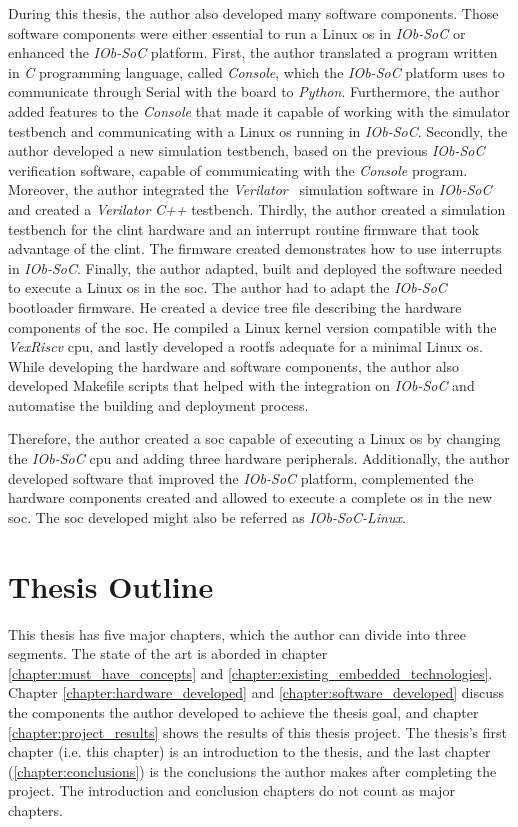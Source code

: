 During this thesis, the author also developed many software components. Those software components were either essential to run a Linux \acrshort{os} in \textit{IOb-SoC} or enhanced the \textit{IOb-SoC} platform. First, the author translated a program written in \textit{C} programming language, called \textit{Console}, which the \textit{IOb-SoC} platform uses to communicate through Serial with the board to \textit{Python}. Furthermore, the author added features to the \textit{Console} that made it capable of working with the simulator testbench and communicating with a Linux \acrshort{os} running in \textit{IOb-SoC}. Secondly, the author developed a new simulation testbench, based on the previous \textit{IOb-SoC} verification software, capable of communicating with the \textit{Console} program. Moreover, the author integrated the \textit{Verilator}~\cite{snyder2010verilator} simulation software in \textit{IOb-SoC} and created a \textit{Verilator} \textit{C++} testbench. Thirdly, the author created a simulation testbench for the \acrshort{clint} hardware and an interrupt routine firmware that took advantage of the \acrshort{clint}. The firmware created demonstrates how to use interrupts in \textit{IOb-SoC}. Finally, the author adapted, built and deployed the software needed to execute a Linux \acrshort{os} in the \acrshort{soc}. The author had to adapt the \textit{IOb-SoC} bootloader firmware. He created a device tree file describing the hardware components of the \acrshort{soc}. He compiled a Linux kernel version compatible with the \textit{VexRiscv} \acrshort{cpu}, and lastly developed a \acrshort{rootfs} adequate for a minimal Linux \acrshort{os}. While developing the hardware and software components, the author also developed Makefile scripts that helped with the integration on \textit{IOb-SoC} and automatise the building and deployment process.

Therefore, the author created a \acrshort{soc} capable of executing a Linux \acrshort{os} by changing the \textit{IOb-SoC} \acrshort{cpu} and adding three hardware peripherals. Additionally, the author developed software that improved the \textit{IOb-SoC} platform, complemented the hardware components created and allowed to execute a complete \acrlong{os} in the new \acrshort{soc}. The \acrshort{soc} developed might also be referred as \textit{IOb-SoC-Linux}.

\section{Thesis Outline}
\label{section:thesis_outline}
This thesis has five major chapters, which the author can divide into three segments. The state of the art is aborded in chapter \ref{chapter:must_have_concepts} and \ref{chapter:existing_embedded_technologies}. Chapter \ref{chapter:hardware_developed} and \ref{chapter:software_developed} discuss the components the author developed to achieve the thesis goal, and chapter \ref{chapter:project_results} shows the results of this thesis project. The thesis's first chapter (i.e. this chapter) is an introduction to the thesis, and the last chapter (\ref{chapter:conclusions}) is the conclusions the author makes after completing the project. The introduction and conclusion chapters do not count as major chapters.

